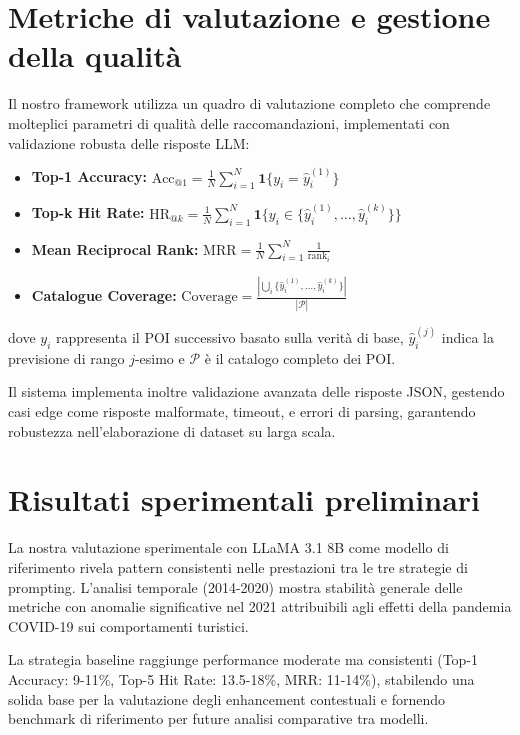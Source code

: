 \section{Metriche di valutazione e gestione della qualità}

Il nostro framework utilizza un quadro di valutazione completo che comprende molteplici parametri di qualità delle raccomandazioni, implementati con validazione robusta delle risposte LLM:

\begin{itemize}
\item \textbf{Top-1 Accuracy:} $\text{Acc}_{@1} = \frac{1}{N}\sum_{i=1}^{N}\mathbf{1}\{y_i = \hat{y}_i^{(1)}\}$
\item \textbf{Top-k Hit Rate:} $\text{HR}_{@k} = \frac{1}{N}\sum_{i=1}^{N}\mathbf{1}\{y_i \in \{\hat{y}_i^{(1)}, \ldots, \hat{y}_i^{(k)}\}\}$
\item \textbf{Mean Reciprocal Rank:} $\text{MRR} = \frac{1}{N}\sum_{i=1}^{N}\frac{1}{\text{rank}_i}$
\item \textbf{Catalogue Coverage:} $\text{Coverage} = \frac{|\bigcup_{i}\{\hat{y}_i^{(1)}, \ldots, \hat{y}_i^{(k)}\}|}{|\mathcal{P}|}$
\end{itemize}

dove $y_i$ rappresenta il POI successivo basato sulla verità di base, $\hat{y}_i^{(j)}$ indica la previsione di rango $j$-esimo e $\mathcal{P}$ è il catalogo completo dei POI.

Il sistema implementa inoltre validazione avanzata delle risposte JSON, gestendo casi edge come risposte malformate, timeout, e errori di parsing, garantendo robustezza nell'elaborazione di dataset su larga scala.


\section{Risultati sperimentali preliminari}

La nostra valutazione sperimentale con LLaMA 3.1 8B come modello di riferimento rivela pattern consistenti nelle prestazioni tra le tre strategie di prompting. L'analisi temporale (2014-2020) mostra stabilità generale delle metriche con anomalie significative nel 2021 attribuibili agli effetti della pandemia COVID-19 sui comportamenti turistici.

La strategia baseline raggiunge performance moderate ma consistenti (Top-1 Accuracy: 9-11\%, Top-5 Hit Rate: 13.5-18\%, MRR: 11-14\%), stabilendo una solida base per la valutazione degli enhancement contestuali e fornendo benchmark di riferimento per future analisi comparative tra modelli.

